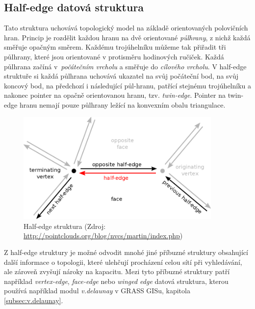 \documentclass[12pt,a4paper]{article}
\begin{document}
\newpage
\subsection{Half-edge datová struktura}
\label{subsec:HE_struct}

Tato struktura uchovává topologický model na základě orientovaných
polovičních hran. Princip je rozdělit každou hranu na dvě orientované
\emph{půlhrany}, z nichž každá směřuje opačným směrem. Každému
trojúhelníku můžeme tak přiřadit tři půlhrany, které jsou orientované
v protisměru hodinových ručiček. Každá půlhrana začíná
v~\emph{počátečním vrcholu} a směřuje do \emph{cílového vrcholu}. V
half-edge struktuře si každá půlhrana uchovává ukazatel na svůj
počáteční bod, na svůj koncový bod, na předchozí i následující
půl-hranu, patřící stejnému trojúhelníku a nakonec pointer na opačně
orientovanou hranu, tzv. \emph{twin-edge}. Pointer na twin-edge hranu
nemají pouze půlhrany ležící na konvexním obalu triangulace.

\begin{figure}[h!]
\centering
\includegraphics[width=0.9\textwidth]{img/half_edge.png}
\caption{Half-edge struktura (Zdroj: \url{http://pointclouds.org/blog/nvcs/martin/index.php})}
\label{fig:half_edge}
\end{figure}

Z half-edge struktury je možné odvodit mnohé jiné příbuzné struktury
obsahující další informace o topologii, které ulehčují procházení
celou sítí při vyhledávání, ale zároveň zvyšují nároky na
kapacitu. Mezi tyto příbuzné struktury patří například
\emph{vertex-edge}, \emph{face-edge} nebo \emph{winged edge} datová
struktura, kterou používá například modul \emph{v.delaunay} v GRASS
GISu, kapitola \ref{subsec:v.delaunay}.
\end{document}
